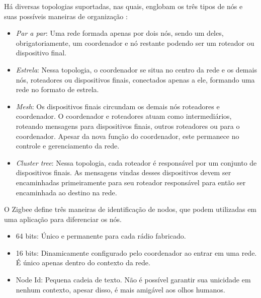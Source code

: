 Há diversas topologias suportadas, nas quais, englobam os três tipos de nós e suas possíveis 
maneiras de organização \cite{Faludi2011}:

\begin{itemize} \parskip -4pt
	\item \textit{Par a par}: Uma rede formada apenas por dois nós, sendo um deles, obrigatoriamente, um 
	coordenador e nó restante podendo ser um roteador ou dispositivo final.
	\item \textit{Estrela}: Nessa topologia, o coordenador se situa no centro da rede e os demais nós, 
	roteadores ou dispositivos finais, conectados apenas a ele, formando uma rede no formato de 
	estrela.
	\item \textit{Mesh}: Os dispositivos finais circundam os demais nós roteadores e coordenador. O 
	coordenador e roteadores atuam como intermediários, roteando mensagens para dispositivos 
	finais, outros roteadores ou para o coordenador. Apesar da nova função do coordenador, este 
	permanece no controle e gerenciamento da rede.
	\item \textit{Cluster tree}: Nessa topologia, cada roteador é responsável por um conjunto de 
	dispositivos finais. As mensagens vindas desses dispositivos devem ser encaminhadas 
	primeiramente para seu roteador responsável para então ser encaminhada ao destino na rede.
\end{itemize}


O Zigbee define três maneiras de identificação de nodos, que podem utilizadas em uma aplicação para 
diferenciar os nós.

\begin{itemize} \parskip -4pt
	\item 64 bits: Único e permanente para cada rádio fabricado.
	\item 16 bits: Dinamicamente configurado pelo coordenador ao entrar em uma rede. É único apenas 
	dentro do contexto da rede.
	\item Node Id: Pequena cadeia de texto. Não é possível garantir sua unicidade em nenhum 
	contexto, apesar disso, é mais amigável aos olhos humanos.
\end{itemize}



